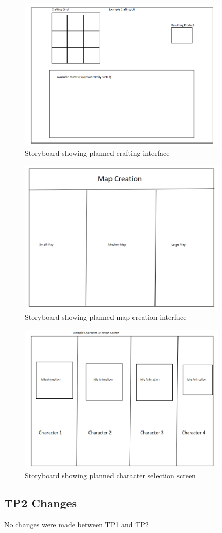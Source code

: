 \documentclass[12pt]{article}
\begin{document}
\begin{figure}[h]
    \centering
    \includegraphics[width = 10cm]{Storyboard3.PNG}
    \caption{Storyboard showing planned crafting interface}
\end{figure}
\begin{figure}[h]
    \centering
    \includegraphics[width = 10cm]{Storyboard4.PNG}
    \caption{Storyboard showing planned map creation interface}
\end{figure}
\begin{figure}[h]
    \centering
    \includegraphics[width = 10cm]{Storyboard5.PNG}
    \caption{Storyboard showing planned character selection screen}
\end{figure}
\newpage
\newpage
\newpage
\subsection{TP2 Changes}
No changes were made between TP1 and TP2
\end{document}
